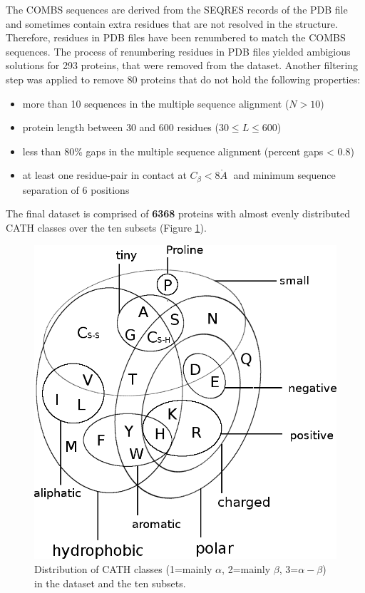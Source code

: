 \documentclass[12pt,a4paper,twoside]{book}
\providecommand{\tightlist}{%
  \setlength{\itemsep}{0pt}\setlength{\parskip}{0pt}}
\newcommand{\angstrom}{\mathring{A} \;}
\theoremstyle{definition}
\theoremstyle{definition}
\theoremstyle{remark}
\begin{document}
The COMBS sequences are derived from the SEQRES records of the PDB file
and sometimes contain extra residues that are not resolved in the
structure. Therefore, residues in PDB files have been renumbered to
match the COMBS sequences. The process of renumbering residues in PDB
files yielded ambigious solutions for 293 proteins, that were removed
from the dataset. Another filtering step was applied to remove 80
proteins that do not hold the following properties:

\begin{itemize}
\tightlist
\item
  more than 10 sequences in the multiple sequence alignment (\(N>10\))
\item
  protein length between 30 and 600 residues (\(30 \leq L \leq 600\))
\item
  less than 80\% gaps in the multiple sequence alignment (percent gaps
  \textless{} 0.8)
\item
  at least one residue-pair in contact at \(C_\beta < 8\angstrom\) and
  minimum sequence separation of 6 positions
\end{itemize}

The final dataset is comprised of \textbf{6368} proteins with almost
evenly distributed CATH classes over the ten subsets (Figure
\ref{fig:dataset-cath-topologies}).





\begin{figure}
\includegraphics[width=1\linewidth]{img/amino_acid_physico_chemical_properties_venn_diagramm} \caption{Distribution of CATH classes
(1=mainly \(\alpha\), 2=mainly \(\beta\), 3=\(\alpha-\beta\)) in the
dataset and the ten subsets. }\label{fig:dataset-cath-topologies}
\end{figure}
\end{document}
